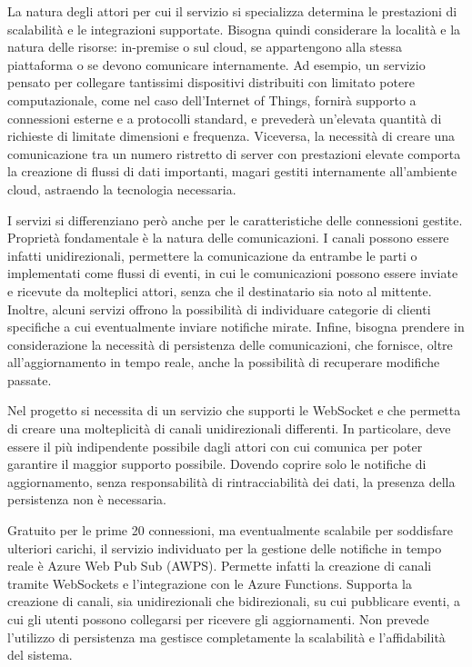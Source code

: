 La natura degli attori per cui il servizio si specializza determina le prestazioni di scalabilità e le integrazioni supportate. Bisogna quindi considerare la località e la natura delle risorse: in-premise o sul cloud, se appartengono alla stessa piattaforma o se devono comunicare internamente.
Ad esempio, un servizio pensato per collegare tantissimi dispositivi distribuiti con limitato potere computazionale, come nel caso dell’Internet of Things, fornirà  supporto a connessioni esterne e a protocolli standard, e prevederà un’elevata quantità di richieste di limitate dimensioni e frequenza. Viceversa, la necessità di creare una comunicazione tra un numero ristretto di server con prestazioni elevate comporta la creazione di flussi di dati importanti, magari gestiti internamente all’ambiente cloud, astraendo la tecnologia necessaria.

I servizi si differenziano però anche per le caratteristiche delle connessioni gestite.
Proprietà fondamentale è la natura delle comunicazioni. I canali possono essere infatti unidirezionali, permettere la comunicazione da entrambe le parti o implementati come flussi di eventi, in cui le comunicazioni possono essere inviate e ricevute da molteplici attori, senza che il destinatario sia noto al mittente. Inoltre, alcuni servizi offrono la possibilità di individuare categorie di clienti specifiche a cui eventualmente inviare notifiche mirate. Infine, bisogna prendere in considerazione la necessità di persistenza delle comunicazioni, che fornisce, oltre all’aggiornamento in tempo reale, anche la possibilità di recuperare modifiche passate.

Nel progetto si necessita di un servizio che supporti le WebSocket e che permetta di creare una molteplicità di canali unidirezionali differenti. In particolare, deve essere il più indipendente possibile dagli attori con cui comunica per poter garantire il maggior supporto possibile. Dovendo coprire solo le notifiche di aggiornamento, senza responsabilità di rintracciabilità dei dati, la presenza della persistenza non è necessaria.

Gratuito per le prime 20 connessioni, ma eventualmente scalabile per soddisfare ulteriori carichi, il servizio individuato per la gestione delle notifiche in tempo reale è Azure Web Pub Sub (AWPS). Permette infatti la creazione di canali tramite WebSockets e l’integrazione con le Azure Functions. Supporta la creazione di canali, sia unidirezionali che bidirezionali, su cui pubblicare eventi, a cui gli utenti possono collegarsi per ricevere gli aggiornamenti. Non prevede l’utilizzo di persistenza ma gestisce completamente la scalabilità e l’affidabilità del sistema.



